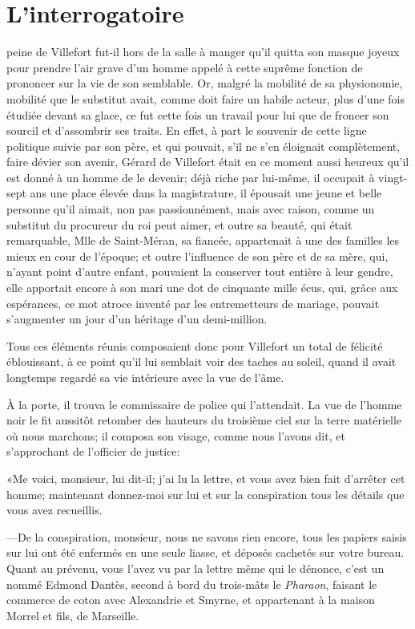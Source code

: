 \chapter{L'interrogatoire}

\lettrine{}{} peine de Villefort fut-il hors de la salle à manger qu'il quitta son masque joyeux pour prendre l'air grave d'un homme appelé à cette suprême fonction de prononcer sur la vie de son semblable. Or, malgré la mobilité de sa physionomie, mobilité que le substitut avait, comme doit faire un habile acteur, plus d'une fois étudiée devant sa glace, ce fut cette fois un travail pour lui que de froncer son sourcil et d'assombrir ses traits. En effet, à part le souvenir de cette ligne politique suivie par son père, et qui pouvait, s'il ne s'en éloignait complètement, faire dévier son avenir, Gérard de Villefort était en ce moment aussi heureux qu'il est donné à un homme de le devenir; déjà riche par lui-même, il occupait à vingt-sept ans une place élevée dans la magistrature, il épousait une jeune et belle personne qu'il aimait, non pas passionnément, mais avec raison, comme un substitut du procureur du roi peut aimer, et outre sa beauté, qui était remarquable, Mlle de Saint-Méran, sa fiancée, appartenait à une des familles les mieux en cour de l'époque; et outre l'influence de son père et de sa mère, qui, n'ayant point d'autre enfant, pouvaient la conserver tout entière à leur gendre, elle apportait encore à son mari une dot de cinquante mille écus, qui, grâce aux espérances, ce mot atroce inventé par les entremetteurs de mariage, pouvait s'augmenter un jour d'un héritage d'un demi-million.

Tous ces éléments réunis composaient donc pour Villefort un total de félicité éblouissant, à ce point qu'il lui semblait voir des taches au soleil, quand il avait longtemps regardé sa vie intérieure avec la vue de l'âme.

À la porte, il trouva le commissaire de police qui l'attendait. La vue de l'homme noir le fit aussitôt retomber des hauteurs du troisième ciel sur la terre matérielle où nous marchons; il composa son visage, comme nous l'avons dit, et s'approchant de l'officier de justice:

«Me voici, monsieur, lui dit-il; j'ai lu la lettre, et vous avez bien fait d'arrêter cet homme; maintenant donnez-moi sur lui et sur la conspiration tous les détails que vous avez recueillis.

—De la conspiration, monsieur, nous ne savons rien encore, tous les papiers saisis sur lui ont été enfermés en une seule liasse, et déposés cachetés sur votre bureau. Quant au prévenu, vous l'avez vu par la lettre même qui le dénonce, c'est un nommé Edmond Dantès, second à bord du trois-mâts le \textit{Pharaon}, faisant le commerce de coton avec Alexandrie et Smyrne, et appartenant à la maison Morrel et fils, de Marseille.

